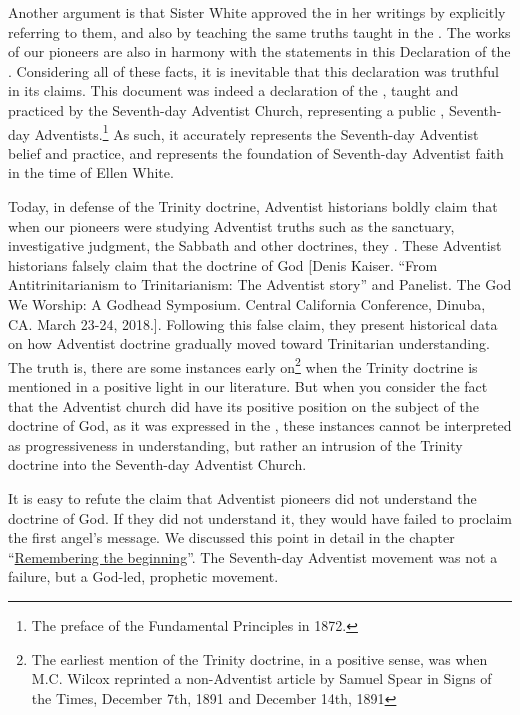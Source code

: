 Another argument is that Sister White approved the  in her writings by explicitly referring to them, and also by teaching the same truths taught in the . The works of our pioneers are also in harmony with the statements in this Declaration of the . Considering all of these facts, it is inevitable that this declaration was truthful in its claims. This document was indeed a declaration of the , taught and practiced by the Seventh-day Adventist Church, representing a public ,  Seventh-day Adventists.\footnote{The preface of the Fundamental Principles in 1872.} As such, it accurately represents the Seventh-day Adventist belief and practice, and represents the foundation of Seventh-day Adventist faith in the time of Ellen White.

Today, in defense of the Trinity doctrine, Adventist historians boldly claim that when our pioneers were studying Adventist truths such as the sanctuary, investigative judgment, the Sabbath and other doctrines, they . These Adventist historians falsely claim that the doctrine of God [Denis Kaiser. “From Antitrinitarianism to Trinitarianism: The Adventist story” and Panelist. The God We Worship: A Godhead Symposium. Central California Conference, Dinuba, CA. March 23-24, 2018.]. Following this false claim, they present historical data on how Adventist doctrine gradually moved toward Trinitarian understanding. The truth is, there are some instances early on\footnote{The earliest mention of the Trinity doctrine, in a positive sense, was when M.C. Wilcox reprinted a non-Adventist article by Samuel Spear in Signs of the Times, December 7th, 1891 and December 14th, 1891} when the Trinity doctrine is mentioned in a positive light in our literature. But when you consider the fact that the Adventist church did have its positive position on the subject of the doctrine of God, as it was expressed in the , these instances cannot be interpreted as progressiveness in understanding, but rather an intrusion of the Trinity doctrine into the Seventh-day Adventist Church.

It is easy to refute the claim that Adventist pioneers did not understand the doctrine of God. If they did not understand it, they would have failed to proclaim the first angel’s message. We discussed this point in detail in the chapter “\hyperref[chap:remebering-the-beginning]{Remembering the beginning}”. The Seventh-day Adventist movement was not a failure, but a God-led, prophetic movement.

